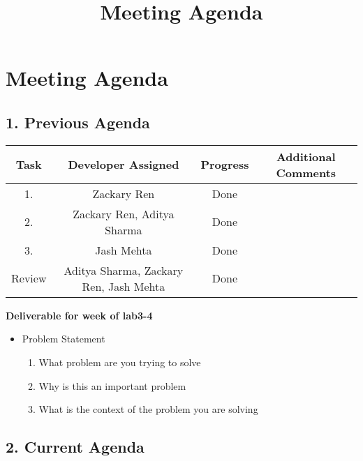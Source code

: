 \documentclass[11pt, oneside]{article}   	%
\title{Meeting Agenda}
\author{}
\begin{document}
\setlength{\headsep}{50pt}
\section*{Meeting Agenda}

\subsection*{1. Previous Agenda}
\begin{center}
\begin{tabular}{ | c | c | c | c | }
\hline
Task & Developer Assigned & Progress & Additional Comments\\
\hline
1. & Zackary Ren & Done &\\
\hline
2. & Zackary Ren, Aditya Sharma & Done &\\
\hline
3. & Jash Mehta & Done &\\
\hline
Review & Aditya Sharma, Zackary Ren, Jash Mehta & Done & \\
\hline
\end{tabular}
\end{center}

\textbf{Deliverable for week of lab3-4}
\begin{itemize}
\item Problem Statement
\begin{enumerate}
\item What problem are you trying to solve
\item Why is this an important problem
\item What is the context of the problem you are solving
\end{enumerate}
\end{itemize}
\newpage{}

\setlength{\headsep}{25pt}
\subsection*{2. Current Agenda}
\end{document}
